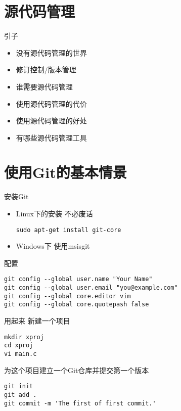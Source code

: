 \part{源代码管理}
\begin{frame}[<+->]{引子}
\begin{itemize}
  \item 没有源代码管理的世界
  \item 修订控制/版本管理
  \item 谁需要源代码管理
  \item 使用源代码管理的代价
  \item 使用源代码管理的好处
  \item 有哪些源代码管理工具
\end{itemize}
\end{frame}

\part{使用Git的基本情景}
\begin{frame}[<+->][fragile]{安装Git}
\begin{itemize}
  \item Linux下的安装
  不必废话
\begin{Verbatim}[frame=single,commandchars=\\\{\}]
sudo apt-get install git-core
\end{Verbatim}

  \item Windows下
  使用msisgit
\end{itemize}
\end{frame}

\begin{frame}[<+->][fragile]{配置}
\begin{Verbatim}[frame=single,commandchars=\\\{\}]
git config --global user.name "Your Name"
git config --global user.email "you@example.com"
git config --global core.editor vim
git config --global core.quotepash false
\end{Verbatim}
\end{frame}

\begin{frame}[<+->][fragile]{用起来}
\onslide<+->
新建一个项目
\begin{Verbatim}[frame=single,commandchars=\\\{\}]
mkdir xproj
cd xproj
vi main.c
\end{Verbatim}

\onslide<+->
为这个项目建立一个Git仓库并提交第一个版本
\begin{Verbatim}[frame=single,commandchars=\\\{\}]
git init
git add .
git commit -m 'The first of first commit.'
\end{Verbatim}
\end{frame}

